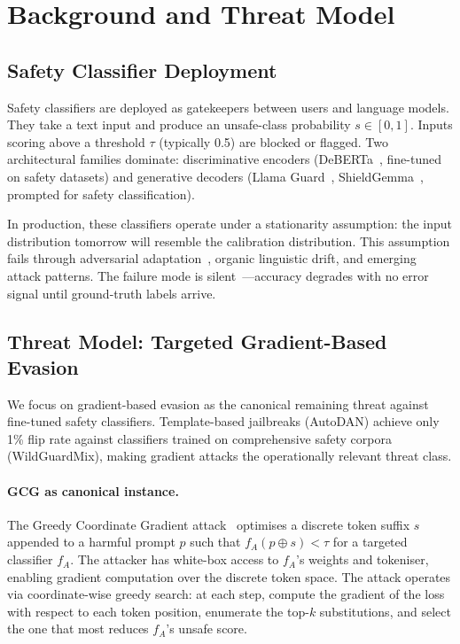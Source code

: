 \documentclass{article}
\begin{document}
\section{Background and Threat Model}
\label{sec:background}

\subsection{Safety Classifier Deployment}

Safety classifiers are deployed as gatekeepers between users and language models. They take a text input and produce an unsafe-class probability $s \in [0,1]$. Inputs scoring above a threshold $\tau$ (typically 0.5) are blocked or flagged. Two architectural families dominate: discriminative encoders (DeBERTa~\citep{he2021deberta}, fine-tuned on safety datasets) and generative decoders (Llama Guard~\citep{inan2023llama}, ShieldGemma~\citep{zeng2024shieldgemma}, prompted for safety classification).

In production, these classifiers operate under a stationarity assumption: the input distribution tomorrow will resemble the calibration distribution. This assumption fails through adversarial adaptation~\citep{zou2023universal}, organic linguistic drift, and emerging attack patterns. The failure mode is silent~\citep{rabanser2019failing}---accuracy degrades with no error signal until ground-truth labels arrive.

\subsection{Threat Model: Targeted Gradient-Based Evasion}

We focus on gradient-based evasion as the canonical remaining threat against fine-tuned safety classifiers. Template-based jailbreaks (AutoDAN) achieve only 1\% flip rate against classifiers trained on comprehensive safety corpora (WildGuardMix), making gradient attacks the operationally relevant threat class.

\paragraph{GCG as canonical instance.} The Greedy Coordinate Gradient attack~\citep{zou2023universal} optimises a discrete token suffix $s$ appended to a harmful prompt $p$ such that $f_A(p \oplus s) < \tau$ for a targeted classifier $f_A$. The attacker has white-box access to $f_A$'s weights and tokeniser, enabling gradient computation over the discrete token space. The attack operates via coordinate-wise greedy search: at each step, compute the gradient of the loss with respect to each token position, enumerate the top-$k$ substitutions, and select the one that most reduces $f_A$'s unsafe score.
\end{document}
